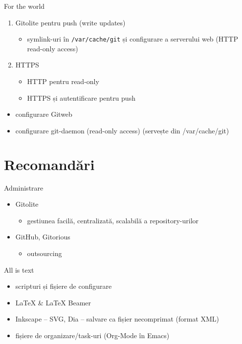 \documentclass{simple}
\begin{document}
\begin{frame}{For the world}
	\begin{enumerate}
		\item Gitolite pentru push (write updates)
          \begin{itemize}
    		\item symlink-uri în \texttt{/var/cache/git} și configurare a
            serverului web (HTTP read-only access)
          \end{itemize}
        \item HTTPS
          \begin{itemize}
            \item HTTP pentru read-only
            \item HTTPS și autentificare pentru push
          \end{itemize}
    \end{enumerate}
    \begin{itemize}
        \item configurare Gitweb
        \item configurare git-daemon (read-only access) (servește din
        /var/cache/git)
	\end{itemize}
\end{frame}

\section{Recomandări}

\begin{frame}{Administrare}
  \begin{itemize}
    \item Gitolite
      \begin{itemize}
        \item gestiunea facilă, centralizată, scalabilă a repository-urilor
      \end{itemize}
    \item GitHub, Gitorious
      \begin{itemize}
        \item outsourcing
      \end{itemize}
  \end{itemize}
\end{frame}

\begin{frame}{All is text}
	\begin{itemize}
		\item scripturi și fișiere de configurare
		\item LaTeX \& LaTeX Beamer
		\item Inkscape -- SVG, Dia -- salvare ca fișier necomprimat (format
		XML)
		\item fișiere de organizare/task-uri (Org-Mode în Emacs)
	\end{itemize}
\end{frame}
\end{document}
